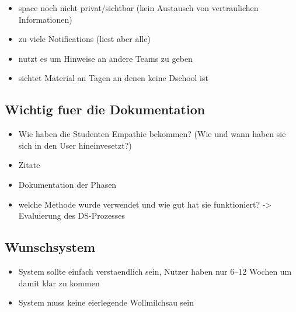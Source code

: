 \begin{itemize}
\item space noch nicht privat\slash sichtbar (kein Austausch von vertraulichen Informationen)
\item zu viele Notifications (liest aber alle)
\item nutzt es um Hinweise an andere Teams zu geben
\item sichtet Material an Tagen an denen keine Dschool ist
\end{itemize}

\subsection*{Wichtig fuer die Dokumentation}
\label{wichtigfuerdiedokumentation}

\begin{itemize}
\item Wie haben die Studenten Empathie bekommen? (Wie und wann haben sie sich in den User hineinvesetzt?)
\item Zitate
\item Dokumentation der Phasen
\item welche Methode wurde verwendet und wie gut hat sie funktioniert? -> Evaluierung des DS-Prozesses
\end{itemize}

\subsection*{Wunschsystem}
\label{wunschsystem}

\begin{itemize}
\item System sollte einfach verstaendlich sein, Nutzer haben nur 6--12 Wochen um damit klar zu kommen
\item System muss keine eierlegende Wollmilchsau sein
\end{itemize}


